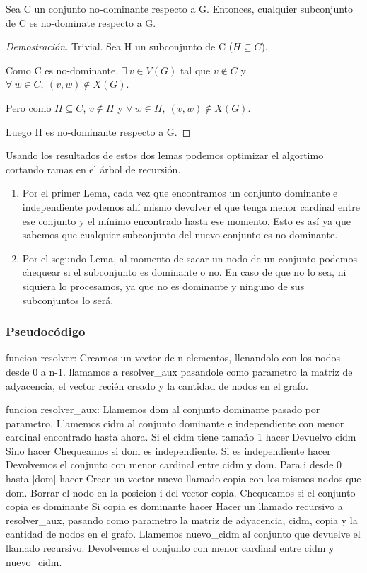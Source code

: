     \begin{lemma}
        Sea C un conjunto no-dominante respecto a G. Entonces, cualquier subconjunto de C es no-dominate respecto a G.
    \end{lemma}
    \begin{proof}[Demostración]
        Trivial. Sea H un subconjunto de C ($H \subseteq C$).

        Como C es no-dominante, $\exists\ v \in V(G)$ tal que $v \notin C$ y $\forall\ w \in C,\ (v,w) \notin X(G)$.

        Pero como $H \subseteq C$, $v \notin H$ y $\forall\ w \in H,\ (v,w) \notin X(G)$.

        Luego H es no-dominante respecto a G.
    \end{proof}

    Usando los resultados de estos dos lemas podemos optimizar el algortimo cortando ramas en el árbol de recursión.
    \begin{enumerate}
        \item Por el primer Lema, cada vez que encontramos un conjunto dominante e independiente podemos ahí mismo devolver el que tenga menor cardinal entre ese conjunto y el mínimo encontrado hasta ese momento. Esto es así ya que sabemos que cualquier subconjunto del nuevo conjunto es no-dominante.
        \item Por el segundo Lema, al momento de sacar un nodo de un conjunto podemos chequear si el subconjunto es dominante o no. En caso de que no lo sea, ni siquiera lo procesamos, ya que no es dominante y ninguno de sus subconjuntos lo será.
    \end{enumerate}
\subsubsection{Pseudocódigo}
\begin{codesnippet}
funcion resolver:
    Creamos un vector de n elementos, llenandolo con los nodos desde 0 a n-1.
    llamamos a resolver_aux pasandole como parametro la matriz de adyacencia, el vector
        recién creado y la cantidad de nodos en el grafo.

funcion resolver_aux:
    Llamemos dom al conjunto dominante pasado por parametro.
    Llamemos cidm al conjunto dominante e independiente con menor cardinal encontrado
        hasta ahora.
    Si el cidm tiene tamaño 1 hacer
        Devuelvo cidm
    Sino hacer
        Chequeamos si dom es independiente.
        Si es independiente hacer
            Devolvemos el conjunto con menor cardinal entre cidm y dom.
    Para i desde 0 hasta |dom| hacer
        Crear un vector nuevo llamado copia con los mismos nodos que dom.
        Borrar el nodo en la posicion i del vector copia.
        Chequeamos si el conjunto copia es dominante
        Si copia es dominante hacer
            Hacer un llamado recursivo a resolver_aux, pasando como parametro la matriz
                de adyacencia, cidm, copia y la cantidad de nodos en el grafo.
            Llamemos nuevo_cidm al conjunto que devuelve el llamado recursivo.
            Devolvemos el conjunto con menor cardinal entre cidm y nuevo_cidm.
\end{codesnippet}

